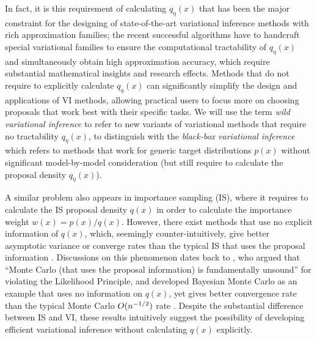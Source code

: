 \documentclass{article} %
\begin{document}
In fact, it is this requirement of calculating $q_\eta(x)$ 
that has been the major constraint for the designing of state-of-the-art variational inference methods with rich approximation families; 
the recent successful algorithms \citep[e.g.,][to name only a few]{rezende2015variational,tran2015variational,ranganath2015hierarchical} 
have to handcraft special variational families 
to ensure the computational tractability of $q_\eta(x)$ and simultaneously obtain high approximation accuracy, 
which require substantial mathematical insights and research effects. 
Methods that do not require to explicitly calculate $q_\eta(x)$ 
can significantly simplify the design and applications of VI methods, 
allowing practical users to focus more on choosing proposals that work best with their specific tasks. %
We will use the term \emph{wild variational inference} to refer to new variants of variational methods that require no tractability $q_\eta(x)$, %
to distinguish with the \emph{black-box variational inference} \citep{ranganath2013black}
which refers to methods that work for generic target distributions $p(x)$ without significant model-by-model consideration (but still require to calculate the proposal density $q_\eta(x)$). 

A similar problem also appears in importance sampling (IS), 
where it requires to calculate the IS proposal density $q(x)$ in order to calculate the importance weight $w(x) = p(x)/q(x)$. 
However, %
there exist methods that use no explicit information of $q(x)$, which, seemingly counter-intuitively, give better asymptotic variance or converge rates than the typical IS that uses the proposal information \citep[e.g.,][]{liu2016black, briol2015probabilistic, henmi2007importance, delyon2014integral}.
Discussions on this phenomenon dates back to \citet{o1987monte}, who 
argued that ``Monte Carlo (that uses the proposal information) is fundamentally unsound'' for violating the Likelihood Principle, 
and developed Bayesian Monte Carlo \citep{o1991bayes} as 
an example that uses no information on $q(x)$, yet gives better convergence rate than the typical Monte Carlo $O(n^{-1/2})$ rate \citep{briol2015probabilistic}. 
Despite the substantial difference between IS and VI, 
these results intuitively suggest the possibility of developing efficient variational inference without calculating $q(x)$ explicitly. 
\end{document}
